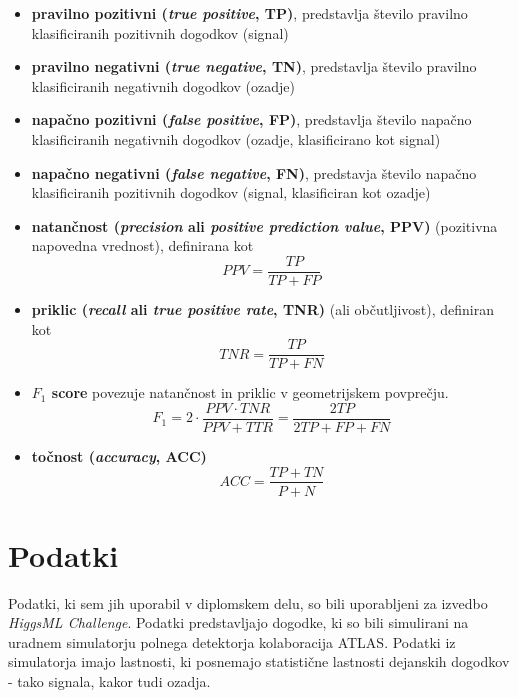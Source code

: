 \documentclass[11pt,a4paper,openany]{book}
\begin{document}
\begin{itemize}
	\item \textbf{pravilno pozitivni (\textit{true positive}, TP)}, predstavlja število pravilno klasificiranih pozitivnih dogodkov (signal)
	\item \textbf{pravilno negativni (\textit{true negative}, TN)}, predstavlja število pravilno klasificiranih negativnih dogodkov (ozadje)
	\item \textbf{napačno pozitivni (\textit{false positive}, FP)}, predstavlja število napačno klasificiranih negativnih dogodkov (ozadje, klasificirano kot signal)
	\item \textbf{napačno negativni (\textit{false negative}, FN)}, predstavja število napačno klasificiranih pozitivnih dogodkov (signal, klasificiran kot ozadje)
	\item \textbf{natančnost (\textit{precision} ali \textit{positive prediction value}, PPV)} (pozitivna napovedna vrednost), definirana kot 
	\begin{equation}	
	PPV = \frac{TP}{TP + FP}
	\end{equation}
	\item \textbf{priklic (\textit{recall} ali \textit{true positive rate}, TNR)} (ali občutljivost), definiran kot
	\begin{equation}	
	TNR = \frac{TP}{TP + FN}
	\end{equation}
	\item \textbf{$F_1$ score} povezuje natančnost in priklic v geometrijskem povprečju. 
	\begin{equation}
	F_1 = 2 \cdot \frac{PPV \cdot TNR}{PPV + TTR} = \frac{2TP}{2TP + FP + FN}
	\end{equation}
	\item \textbf{točnost (\textit{accuracy}, ACC)}
	\begin{equation}
	ACC = \frac{TP + TN}{P + N}
	\end{equation}
\end{itemize}

\chapter{Podatki}
\label{analiza-podatkov}
Podatki, ki sem jih uporabil v diplomskem delu, so bili uporabljeni za izvedbo \textit{HiggsML Challenge}. Podatki predstavljajo dogodke, ki so bili simulirani na uradnem simulatorju polnega detektorja kolaboracija ATLAS\cite{Adam-Bourdarios14}. Podatki iz simulatorja imajo lastnosti, ki posnemajo statistične lastnosti dejanskih dogodkov - tako signala, kakor tudi ozadja.
\end{document}
